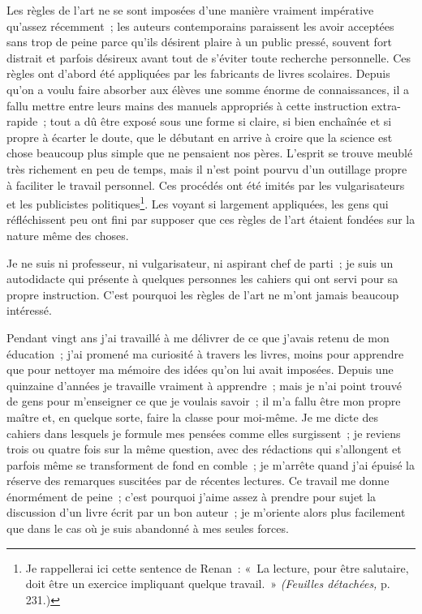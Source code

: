 \documentclass[french,twoside]{book} %
\begin{document}
Les règles de l’art ne se sont imposées d’une manière vraiment impérative qu’assez récemment ; les auteurs contemporains paraissent les avoir acceptées sans trop de  peine parce qu’ils désirent plaire à un public pressé, souvent fort distrait et parfois désireux avant tout de s’éviter toute recherche personnelle. Ces règles ont d’abord été appliquées par les fabricants de livres scolaires. Depuis qu’on a voulu faire absorber aux élèves une somme énorme de connaissances, il a fallu mettre entre leurs mains des manuels appropriés à cette instruction extra-rapide ; tout a dû être exposé sous une forme si claire, si bien enchaînée et si propre à écarter le doute, que le débutant en arrive à croire que la science est chose beaucoup plus simple que ne pensaient nos pères. L’esprit se trouve meublé très richement en peu de temps, mais il n’est point pourvu d’un outillage propre à faciliter le travail personnel. Ces procédés ont été imités par les vulgarisateurs et les publicistes politiques\footnote{ \noindent Je rappellerai ici cette sentence de Renan : « La lecture, pour être salutaire, doit être un exercice impliquant quelque travail. » \emph{(Feuilles détachées,} p. 231.)
 }. Les voyant si largement appliquées, les gens qui réfléchissent peu ont fini par supposer que ces règles de l’art étaient fondées sur la nature même des choses.\par
Je ne suis ni professeur, ni vulgarisateur, ni aspirant chef de parti ; je suis un autodidacte qui présente à quelques personnes les cahiers qui ont servi pour sa propre instruction. C’est pourquoi les règles de l’art ne m’ont jamais beaucoup intéressé.\par
Pendant vingt ans j’ai travaillé à me délivrer de ce que j’avais retenu de mon éducation ; j’ai promené ma curiosité à travers les livres, moins pour apprendre que pour nettoyer ma mémoire des idées qu’on lui avait  imposées. Depuis une quinzaine d’années je travaille vraiment à apprendre ; mais je n’ai point trouvé de gens pour m’enseigner ce que je voulais savoir ; il m’a fallu être mon propre maître et, en quelque sorte, faire la classe pour moi-même. Je me dicte des cahiers dans lesquels je formule mes pensées comme elles surgissent ; je reviens trois ou quatre fois sur la même question, avec des rédactions qui s’allongent et parfois même se transforment de fond en comble ; je m’arrête quand j’ai épuisé la réserve des remarques suscitées par de récentes lectures. Ce travail me donne énormément de peine ; c’est pourquoi j’aime assez à prendre pour sujet la discussion d’un livre écrit par un bon auteur ; je m’oriente alors plus facilement que dans le cas où je suis abandonné à mes seules forces.\par
\end{document}
